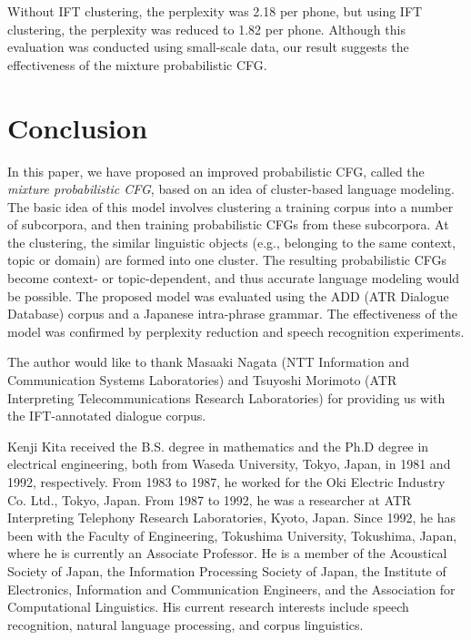 Without IFT clustering, the perplexity was 2.18 per phone,
but using IFT clustering, the perplexity was reduced to 1.82 per phone.
Although this evaluation was conducted using small-scale data,
our result suggests the effectiveness of
the mixture probabilistic CFG.




\section{Conclusion}

In this paper,
we have proposed an improved probabilistic CFG,
called the {\em mixture probabilistic CFG},
based on an idea of cluster-based language modeling.
The basic idea of this model involves
clustering a training corpus into a number of subcorpora,
and then training probabilistic CFGs from these subcorpora.
At the clustering, the similar linguistic objects
(e.g., belonging to the same context, topic or domain)
are formed into one cluster.
The resulting probabilistic CFGs become
context- or topic-dependent,
and thus accurate language modeling would be possible.
The proposed model was evaluated
using the ADD (ATR Dialogue Database) corpus and a Japanese intra-phrase
grammar.
The effectiveness of the model
was confirmed by perplexity reduction and speech recognition experiments.


\acknowledgment

The author would like to thank Masaaki Nagata
(NTT Information and Communication Systems Laboratories)
and Tsuyoshi Morimoto (ATR Interpreting Telecommunications Research Laboratories)
for providing us with the IFT-annotated dialogue corpus.




\begin{biography}

\biotitle{}

{
Kenji Kita received the B.S. degree in mathematics 
and the Ph.D degree in electrical engineering,
both from Waseda University,
Tokyo, Japan, in 1981 and 1992, respectively.
From 1983 to 1987, he worked for the Oki Electric Industry Co. Ltd., Tokyo, Japan.
From 1987 to 1992,
he was a researcher at ATR Interpreting Telephony
Research Laboratories, Kyoto, Japan.
Since 1992, he has been with the Faculty of Engineering,
Tokushima University, Tokushima, Japan,
where he is currently an Associate Professor.
He is a member of the Acoustical Society of Japan,
the Information Processing Society of Japan,
the Institute of Electronics, Information and Communication Engineers,
and the Association for Computational Linguistics.
His current research interests include speech recognition,
natural language processing, and corpus linguistics.
}


\end{biography}


